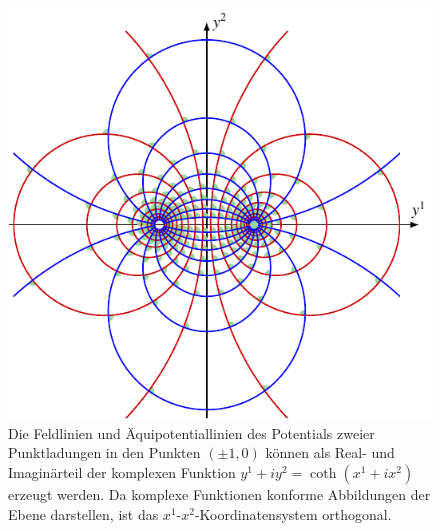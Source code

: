 %
%
%
\begin{figure}
\centering
\includegraphics{papers/diffortho/images/bipolar.pdf}
\caption{Die Feldlinien und Äquipotentiallinien des Potentials
zweier Punktladungen in den Punkten $(\pm 1,0)$ können als Real-
und Imaginärteil der komplexen Funktion $y^1 + iy^2=\coth(x^1+ix^2)$ 
erzeugt werden.
Da komplexe Funktionen konforme Abbildungen der Ebene darstellen,
ist das $x^1$-$x^2$-Koordinatensystem orthogonal.
\label{diffortho:fig:bipolar}}
\end{figure}
